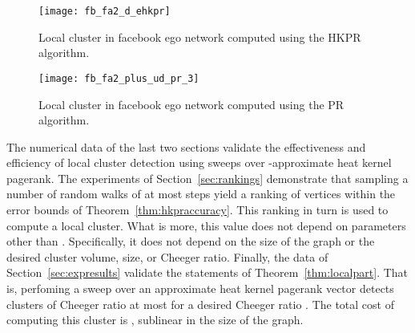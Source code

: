 \documentclass[runningheads,a4paper]{llncs}
\begin{document}
\begin{figure}
\centering
\texttt{[image: fb\_fa2\_d\_ehkpr]}
\caption{Local cluster in facebook ego network computed using the HKPR
algorithm.}
\label{fig:fb_ehkpr}
\end{figure}

\begin{figure}
\centering
\texttt{[image: fb\_fa2\_plus\_ud\_pr\_3]}
\caption{Local cluster in facebook ego network computed using the PR
algorithm.}
\label{fig:fb_pr}
\end{figure}

The numerical data of the last two sections validate the effectiveness and
efficiency of local cluster detection using sweeps over -approximate
heat kernel pagerank.  The experiments of Section~\ref{sec:rankings} demonstrate
that sampling a number of random walks of at most  steps yield a ranking of
vertices within the error bounds of Theorem~\ref{thm:hkpraccuracy}.  This ranking
in turn is used to compute a local cluster.  What is more, this value  does
not depend on parameters other than .  Specifically, it does not
depend on the size of the graph or the desired cluster volume, size, or Cheeger
ratio.  Finally, the data of Section~\ref{sec:expresults} validate the
statements of Theorem~\ref{thm:localpart}.  That is, perfoming a sweep over an
approximate heat kernel pagerank vector detects clusters of Cheeger ratio at
most  for a desired Cheeger ratio .  The total cost of
computing this cluster is , sublinear in the size of the graph. 



  
\end{document}
